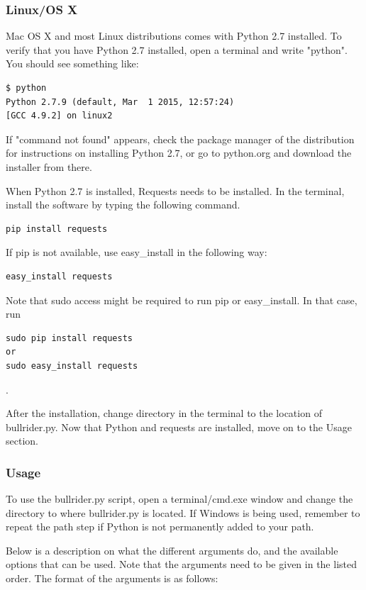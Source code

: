 \subsubsection{Linux/OS X}
Mac OS X and most Linux distributions comes with Python 2.7 installed. To verify that you have Python 2.7 installed, open a terminal and write "python". You should see something like:
\begin{verbatim}
$ python
Python 2.7.9 (default, Mar  1 2015, 12:57:24)
[GCC 4.9.2] on linux2
\end{verbatim}

\noindent If "command not found" appears, check the package manager of the distribution for instructions on installing Python 2.7, or go to python.org and download the installer from there.

When Python 2.7 is installed, Requests needs to be installed. In the terminal, install the software by typing the following command.

\begin{verbatim}
pip install requests
\end{verbatim}

\noindent If pip is not available, use easy\_install in the following way:

\begin{verbatim}
easy_install requests
\end{verbatim}

\noindent Note that sudo access might be required to run pip or easy\_install. In that case, run 
\begin{verbatim} 
sudo pip install requests
or
sudo easy_install requests 
\end{verbatim}.

\noindent After the installation, change directory in the terminal to the location of bullrider.py. Now that Python and requests are installed, move on to the Usage section.


\subsubsection{Usage}
\label{subsubsec:usermanual_Testscripts_usage}
To use the bullrider.py script, open a terminal/cmd.exe window and change the directory to where bullrider.py is located. If Windows is being used, remember to repeat the path step if Python is not permanently added to your path. 

Below is a description on what the different arguments do, and the available options that can be used. Note that the arguments need to be given in the listed order.
The format of the arguments is as follows:

